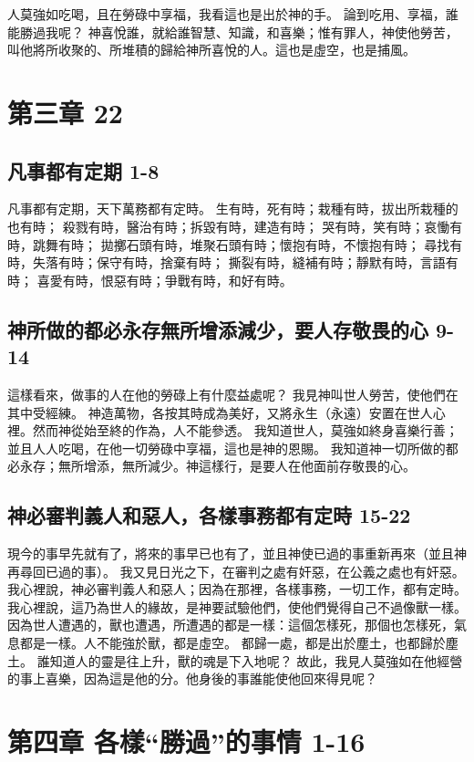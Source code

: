 人莫強如吃喝，且在勞碌中享福，我看這也是出於神的手。
論到吃用、享福，誰能勝過我呢？
神喜悅誰，就給誰智慧、知識，和喜樂；惟有罪人，神使他勞苦，叫他將所收聚的、所堆積的歸給神所喜悅的人。這也是虛空，也是捕風。

\section{第三章   22}
\subsection{凡事都有定期 1-8}
凡事都有定期，天下萬務都有定時。
生有時，死有時；栽種有時，拔出所栽種的也有時；
殺戮有時，醫治有時；拆毀有時，建造有時；
哭有時，笑有時；哀慟有時，跳舞有時；
拋擲石頭有時，堆聚石頭有時；懷抱有時，不懷抱有時；
尋找有時，失落有時；保守有時，捨棄有時；
撕裂有時，縫補有時；靜默有時，言語有時；
喜愛有時，恨惡有時；爭戰有時，和好有時。

\subsection{神所做的都必永存無所增添減少，要人存敬畏的心 9-14}
這樣看來，做事的人在他的勞碌上有什麼益處呢？
我見神叫世人勞苦，使他們在其中受經練。
神造萬物，各按其時成為美好，又將永生（永遠）安置在世人心裡。然而神從始至終的作為，人不能參透。
我知道世人，莫強如終身喜樂行善；
並且人人吃喝，在他一切勞碌中享福，這也是神的恩賜。
我知道神一切所做的都必永存；無所增添，無所減少。神這樣行，是要人在他面前存敬畏的心。

\subsection{神必審判義人和惡人，各樣事務都有定時 15-22}
現今的事早先就有了，將來的事早已也有了，並且神使已過的事重新再來（並且神再尋回已過的事）。
我又見日光之下，在審判之處有奸惡，在公義之處也有奸惡。
我心裡說，神必審判義人和惡人；因為在那裡，各樣事務，一切工作，都有定時。
我心裡說，這乃為世人的緣故，是神要試驗他們，使他們覺得自己不過像獸一樣。
因為世人遭遇的，獸也遭遇，所遭遇的都是一樣：這個怎樣死，那個也怎樣死，氣息都是一樣。人不能強於獸，都是虛空。
都歸一處，都是出於塵土，也都歸於塵土。
誰知道人的靈是往上升，獸的魂是下入地呢？
故此，我見人莫強如在他經營的事上喜樂，因為這是他的分。他身後的事誰能使他回來得見呢？

\section{第四章 各樣“勝過”的事情 1-16}
